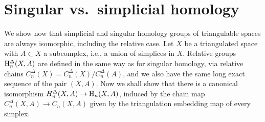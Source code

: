 \section{Singular vs.~simplicial homology}

We show now that simplicial and singular homology groups of triangulable spaces are always isomorphic, including the relative case. Let $X$ be a triangulated space with $A\subset X$ a subcomplex, i.e., a union of simplices in $X$. Relative groups $\mathrm{H}^{\Delta}_n(X,A)$ are defined in the same way as for singular homology, via relative chains $C^\Delta_n(X)=C^\Delta_n(X)/C^\Delta_n(A)$, and we also have the same long exact sequence of the pair $(X,A)$. Now we shall show that there is a canonical isomorphism $H^\Delta_n(X,A)\to \mathrm{H}_n(X,A)$, induced by the chain map $C_n^\Delta(X,A)\to C_n(X,A)$ given by the triangulation embedding map of every simplex. 

